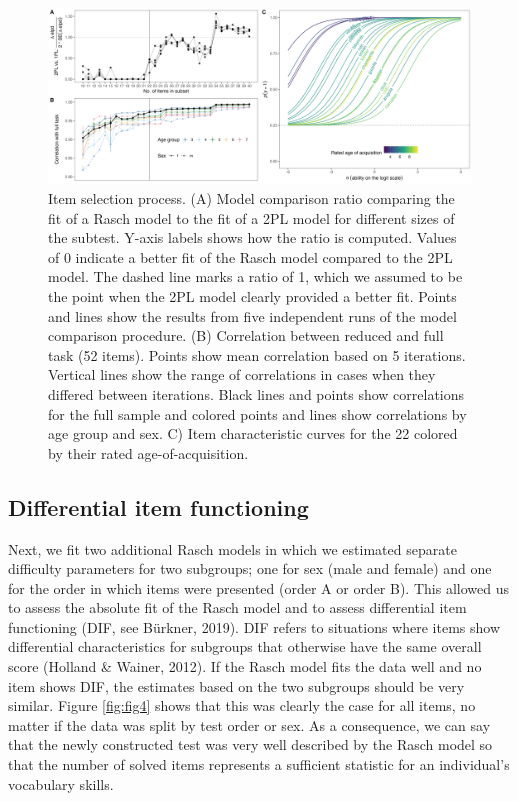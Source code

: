 \documentclass[
  man,floatsintext]{apa6}
\begin{document}
\begin{figure}

{\centering \includegraphics[width=1\linewidth]{../graphs/item_fig2} 

}

\caption{Item selection process. (A) Model comparison ratio comparing the fit of a Rasch model to the fit of a 2PL model for different sizes of the subtest. Y-axis labels shows how the ratio is computed. Values of 0 indicate a better fit of the Rasch model compared to the 2PL model. The dashed line marks a ratio of 1, which we assumed to be the point when the 2PL model clearly provided a better fit. Points and lines show the results from five independent runs of the model comparison procedure. (B) Correlation between reduced and full task (52 items). Points show mean correlation based on 5 iterations. Vertical lines show the range of correlations in cases when they differed between iterations. Black lines and points show correlations for the full sample and colored points and lines show correlations by age group and sex. C) Item characteristic curves for the 22 colored by their rated age-of-acquisition.}\label{fig:fig3}
\end{figure}

\hypertarget{differential-item-functioning}{%
\subsection{Differential item functioning}\label{differential-item-functioning}}

Next, we fit two additional Rasch models in which we estimated separate difficulty parameters for two subgroups; one for sex (male and female) and one for the order in which items were presented (order A or order B). This allowed us to assess the absolute fit of the Rasch model and to assess differential item functioning (DIF, see Bürkner, 2019). DIF refers to situations where items show differential characteristics for subgroups that otherwise have the same overall score (Holland \& Wainer, 2012). If the Rasch model fits the data well and no item shows DIF, the estimates based on the two subgroups should be very similar. Figure \ref{fig:fig4} shows that this was clearly the case for all items, no matter if the data was split by test order or sex. As a consequence, we can say that the newly constructed test was very well described by the Rasch model so that the number of solved items represents a sufficient statistic for an individual's vocabulary skills.
\end{document}
